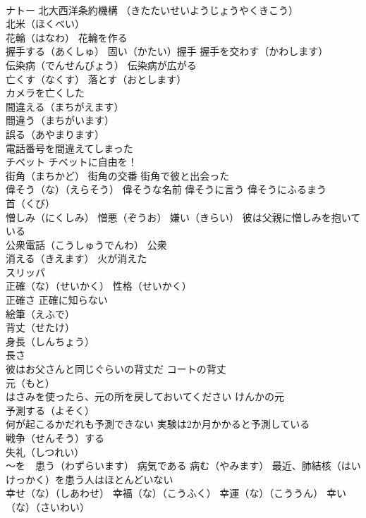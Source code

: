 \documentclass[8pt]{extreport}
\begin{document}
\begin{CJK}{UTF8}{min}
\\	ナトー 北大西洋条約機構 （きたたいせいようじょうやくきこう）
\\	北米（ほくべい）
\\	花輪（はなわ） 花輪を作る
\\	握手する（あくしゅ） 固い（かたい）握手 握手を交わす（かわします）
\\	伝染病（でんせんびょう） 伝染病が広がる
\\	亡くす（なくす） 落とす（おとします） 
\\	カメラを亡くした
\\	間違える（まちがえます）
\\	間違う（まちがいます）
\\	誤る（あやまります）
\\	電話番号を間違えてしまった
\\	チベット チベットに自由を！
\\	街角（まちかど） 街角の交番 街角で彼と出会った
\\	偉そう（な）（えらそう） 偉そうな名前 偉そうに言う 偉そうにふるまう
\\	首（くび）
\\	憎しみ（にくしみ） 憎悪（ぞうお） 嫌い（きらい） 彼は父親に憎しみを抱いている
\\	公衆電話（こうしゅうでんわ） 公衆
\\	消える（きえます） 火が消えた
\\	スリッパ
\\	正確（な）（せいかく） 性格（せいかく）
\\	正確さ 正確に知らない
\\	絵筆（えふで）
\\	背丈（せたけ）
\\	身長（しんちょう）
\\	長さ 
\\	彼はお父さんと同じぐらいの背丈だ コートの背丈
\\	元（もと） 
\\	はさみを使ったら、元の所を戻しておいてください けんかの元
\\	予測する（よそく）
\\	何が起こるかだれも予測できない 実験は2か月かかると予測している
\\	戦争（せんそう）する
\\	失礼（しつれい）
\\	～を　患う（わずらいます） 病気である 病む（やみます） 最近、肺結核（はいけっかく）を患う人はほとんどいない
\\	幸せ（な）（しあわせ） 幸福（な）（こうふく） 幸運（な）（こううん） 幸い（な）（さいわい）

\end{CJK}
\end{document}
